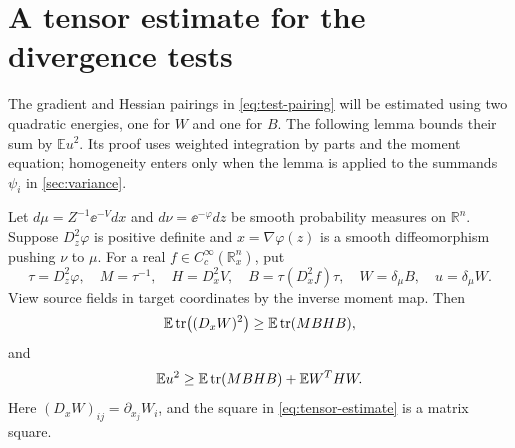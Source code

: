\section{A tensor estimate for the divergence tests}\label{sec:tensor}

The gradient and Hessian pairings in \eqref{eq:test-pairing} will be estimated using two quadratic energies, one for $W$ and one for $B$. The following lemma bounds their sum by $\mathbb{E}u^2$. Its proof uses weighted integration by parts and the moment equation; homogeneity enters only when the lemma is applied to the summands $\psi_i$ in \cref{sec:variance}.

\begin{lemma}\label{lem:tensor}
Let $d\mu=Z^{-1}\ee^{-V}dx$ and $d\nu=\ee^{-\varphi}dz$ be smooth probability measures on $\mathbb{R}^n$.  Suppose $D_z^2\varphi$ is positive definite and $x=\nabla\varphi(z)$ is a smooth diffeomorphism pushing $\nu$ to $\mu$. For a real $f\in C_c^\infty(\mathbb{R}_x^n)$, put
\[
 \tau=D_z^2\varphi,\quad M=\tau^{-1},\quad H=D_x^2V,
 \quad B=\tau(D_x^2f)\tau,
 \quad W=\delta_\mu B,
 \quad u=\delta_\mu W.
\]
View source fields in target coordinates by the inverse moment map. Then
\begin{equation}\label{eq:tensor-estimate}
 \mathbb{E}\tr\bigl((D_xW)^2\bigr)
 \ge \mathbb{E}\tr(MBHB),
\end{equation}
and
\begin{equation}\label{eq:tensor-energy}
 \mathbb{E}u^2\ge\mathbb{E}\tr(MBHB)+\mathbb{E}W^THW.
\end{equation}
Here $(D_xW)_{ij}=\partial_{x_j}W_i$, and the square in \eqref{eq:tensor-estimate} is a matrix square.
\end{lemma}

